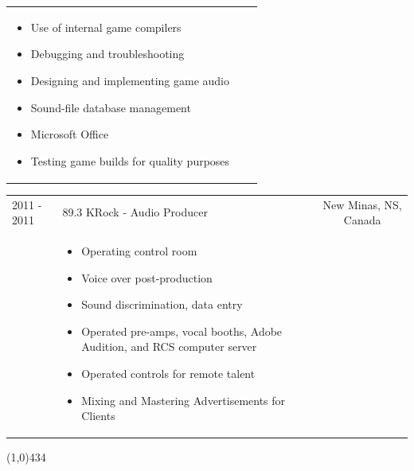 \documentclass{res}
\newcommand{\frstCVcell}{2.5cm}
\begin{document}
\begin{resume}
\begin{tabularx}{\textwidth}{p{\frstCVcell}Xc}
\begin{itemize}
    \item Use of internal game compilers
    \item Debugging and troubleshooting
    \item Designing and implementing game audio
    \item Sound-file database management
    \item Microsoft Office
    \item Testing game builds for quality purposes
    \end{itemize}
    & \\
    \end{tabularx}
    \begin{tabularx}{\textwidth}{p{\frstCVcell}Xc}
    2011 - 2011 & 89.3 KRock - Audio Producer & New Minas, NS, Canada\\
    &
    \begin{itemize}
    \item Operating control room
    \item Voice over post-production
    \item Sound discrimination, data entry
    \item Operated pre-amps, vocal booths, Adobe Audition, and RCS computer server
    \item Operated controls for remote talent
    \item Mixing and Mastering Advertisements for Clients
    \end{itemize}
    & \\
  \end{tabularx}
  \newline
  \line(1,0){434}

  \pagebreak

\end{resume}
\end{document}

